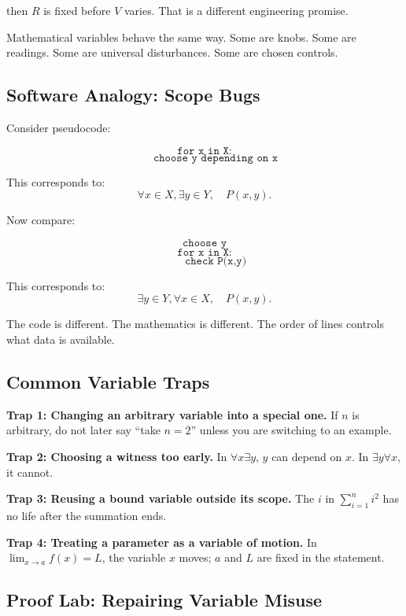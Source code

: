 then $R$ is fixed before $V$ varies. That is a different engineering promise.

Mathematical variables behave the same way. Some are knobs. Some are readings. Some are universal disturbances. Some are chosen controls.

\subsection{Software Analogy: Scope Bugs}

Consider pseudocode:

\[
\texttt{for x in X:}
\]
\[
\qquad\texttt{choose y depending on x}
\]

This corresponds to:
\[
\forall x\in X,\exists y\in Y,\quad P(x,y).
\]

Now compare:

\[
\texttt{choose y}
\]
\[
\texttt{for x in X:}
\]
\[
\qquad\texttt{check P(x,y)}
\]

This corresponds to:
\[
\exists y\in Y,\forall x\in X,\quad P(x,y).
\]

The code is different. The mathematics is different. The order of lines controls what data is available.

\subsection{Common Variable Traps}

\begin{trapbox}
\textbf{Trap 1: Changing an arbitrary variable into a special one.}
If $n$ is arbitrary, do not later say ``take $n=2$'' unless you are switching to an example.

\textbf{Trap 2: Choosing a witness too early.}
In $\forall x\exists y$, $y$ can depend on $x$. In $\exists y\forall x$, it cannot.

\textbf{Trap 3: Reusing a bound variable outside its scope.}
The $i$ in $\sum_{i=1}^{n}i^2$ has no life after the summation ends.

\textbf{Trap 4: Treating a parameter as a variable of motion.}
In $\lim_{x\to a}f(x)=L$, the variable $x$ moves; $a$ and $L$ are fixed in the statement.
\end{trapbox}

\subsection{Proof Lab: Repairing Variable Misuse}

